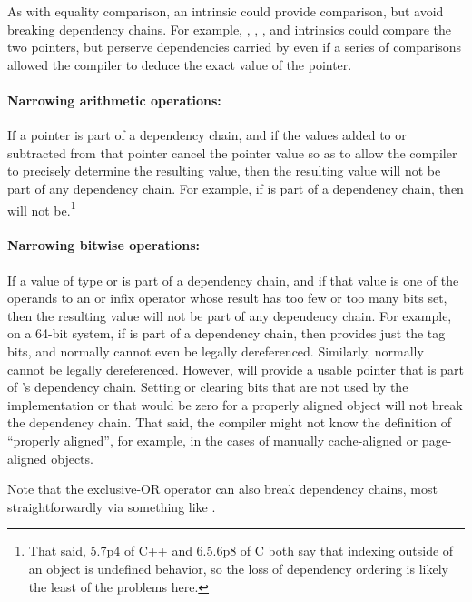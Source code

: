 \documentclass[letterpaper,twocolumn,10pt]{article}
\begin{document}
As with equality comparison, an intrinsic could provide comparison, but avoid
breaking dependency chains.
For example,
,
,
, and
intrinsics could
compare the two pointers, but perserve dependencies carried
by  even if a series of comparisons allowed the
compiler to deduce the exact value of the pointer.

\paragraph{Narrowing arithmetic operations:}
If a pointer is part of a dependency chain, and if the values
added to or subtracted from that pointer cancel the pointer
value so as to allow the compiler to precisely
determine the resulting value, then the resulting value will
not be part of any dependency chain.
For example, if  is part of a dependency chain, then
 will not be.\footnote{
	That said, 5.7p4 of C++ and 6.5.6p8 of C both say that
	indexing outside of an object is undefined behavior,
	so the loss of dependency ordering is likely the least of
	the problems here.}

\paragraph{Narrowing bitwise operations:}
If a value of type  or  is part of a
dependency chain, and if that value is one of the operands
to an \co{&} or \co{|} infix operator whose
result has too few or too many bits set, then the resulting value will
not be part of any dependency chain.
For example, on a 64-bit system, if  is part of a
dependency chain, then  provides just the
tag bits, and normally cannot even be legally dereferenced.
Similarly,  normally cannot be legally dereferenced.
However,  will provide a usable pointer that is
part of 's dependency chain.
Setting or clearing bits that are not used by the implementation
or that would be zero for a properly aligned object will not
break the dependency chain.
That said, the compiler might not know the definition of
``properly aligned'', for example, in the cases of
manually cache-aligned or page-aligned objects.

Note that the \co{^} exclusive-OR operator can also break dependency
chains, most straightforwardly via something like .
\end{document}
